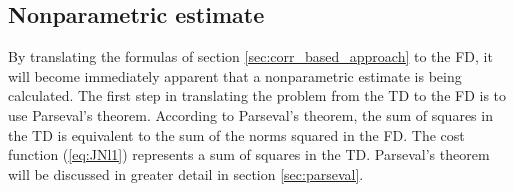 
\subsection{Nonparametric estimate}
By translating the formulas of section \ref{sec:corr_based_approach} to the FD, it will become immediately apparent that a nonparametric estimate is being calculated. The first step in translating the problem from the TD to the FD is to use Parseval's theorem. According to Parseval's theorem, the sum of squares in the TD is equivalent to the sum of the norms squared in the FD. The cost function (\ref{eq:JNl1}) represents a sum of squares in the TD. Parseval's theorem will be discussed in greater detail in section \ref{sec:parseval}.

